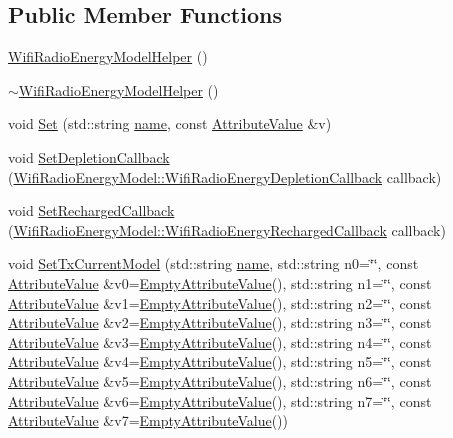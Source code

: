 \subsection*{Public Member Functions}
\begin{DoxyCompactItemize}
\item 
\hyperlink{classns3_1_1WifiRadioEnergyModelHelper_a81f4ebb66b91bd709eaf8fbf4e920c67}{Wifi\+Radio\+Energy\+Model\+Helper} ()
\item 
\hyperlink{classns3_1_1WifiRadioEnergyModelHelper_ae701502305a782d9426d2b677f2c3939}{$\sim$\+Wifi\+Radio\+Energy\+Model\+Helper} ()
\item 
void \hyperlink{classns3_1_1WifiRadioEnergyModelHelper_a8fb76b591e426c6a8fcdc7fc411e3295}{Set} (std\+::string \hyperlink{generate__test__data__lte__spectrum__model_8m_ab74e6bf80237ddc4109968cedc58c151}{name}, const \hyperlink{classns3_1_1AttributeValue}{Attribute\+Value} \&v)
\item 
void \hyperlink{classns3_1_1WifiRadioEnergyModelHelper_a5b2233e44f4dd5cb6193901aefc975de}{Set\+Depletion\+Callback} (\hyperlink{classns3_1_1WifiRadioEnergyModel_afdab2f5c9b565fd1ef7cf3fddd62ffab}{Wifi\+Radio\+Energy\+Model\+::\+Wifi\+Radio\+Energy\+Depletion\+Callback} callback)
\item 
void \hyperlink{classns3_1_1WifiRadioEnergyModelHelper_a33d8864d8fd315e2b1b4b8ca0ef5ab5a}{Set\+Recharged\+Callback} (\hyperlink{classns3_1_1WifiRadioEnergyModel_a1b594cba69350dd9bb93fc525f6124c4}{Wifi\+Radio\+Energy\+Model\+::\+Wifi\+Radio\+Energy\+Recharged\+Callback} callback)
\item 
void \hyperlink{classns3_1_1WifiRadioEnergyModelHelper_af28d094d9f3bd8d170bd4146b1fdf11f}{Set\+Tx\+Current\+Model} (std\+::string \hyperlink{generate__test__data__lte__spectrum__model_8m_ab74e6bf80237ddc4109968cedc58c151}{name}, std\+::string n0=\char`\"{}\char`\"{}, const \hyperlink{classns3_1_1AttributeValue}{Attribute\+Value} \&v0=\hyperlink{classns3_1_1EmptyAttributeValue}{Empty\+Attribute\+Value}(), std\+::string n1=\char`\"{}\char`\"{}, const \hyperlink{classns3_1_1AttributeValue}{Attribute\+Value} \&v1=\hyperlink{classns3_1_1EmptyAttributeValue}{Empty\+Attribute\+Value}(), std\+::string n2=\char`\"{}\char`\"{}, const \hyperlink{classns3_1_1AttributeValue}{Attribute\+Value} \&v2=\hyperlink{classns3_1_1EmptyAttributeValue}{Empty\+Attribute\+Value}(), std\+::string n3=\char`\"{}\char`\"{}, const \hyperlink{classns3_1_1AttributeValue}{Attribute\+Value} \&v3=\hyperlink{classns3_1_1EmptyAttributeValue}{Empty\+Attribute\+Value}(), std\+::string n4=\char`\"{}\char`\"{}, const \hyperlink{classns3_1_1AttributeValue}{Attribute\+Value} \&v4=\hyperlink{classns3_1_1EmptyAttributeValue}{Empty\+Attribute\+Value}(), std\+::string n5=\char`\"{}\char`\"{}, const \hyperlink{classns3_1_1AttributeValue}{Attribute\+Value} \&v5=\hyperlink{classns3_1_1EmptyAttributeValue}{Empty\+Attribute\+Value}(), std\+::string n6=\char`\"{}\char`\"{}, const \hyperlink{classns3_1_1AttributeValue}{Attribute\+Value} \&v6=\hyperlink{classns3_1_1EmptyAttributeValue}{Empty\+Attribute\+Value}(), std\+::string n7=\char`\"{}\char`\"{}, const \hyperlink{classns3_1_1AttributeValue}{Attribute\+Value} \&v7=\hyperlink{classns3_1_1EmptyAttributeValue}{Empty\+Attribute\+Value}())
\end{DoxyCompactItemize}
